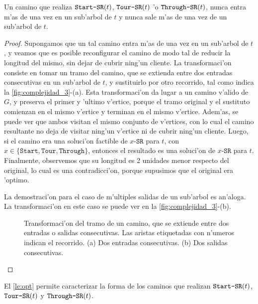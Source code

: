 \begin{lemma}
\label{le:opt}
Un camino que realiza $\texttt{Start-SR}(t)$, $\texttt{Tour-SR}(t)$ 'o $\texttt{Through-SR}(t)$, nunca entra m'as de una vez en un sub'arbol de $t$ y nunca sale m'as de una vez de un sub'arbol de $t$.

\begin{proof}
Supongamos que un tal camino entra m'as de una vez en un sub'arbol de $t$, y veamos que es posible reconfigurar el camino de modo tal de reducir la longitud del mismo, sin dejar de cubrir ning'un cliente. La transformaci'on consiste en tomar un tramo del camino, que se extienda entre dos entradas consecutivas en un sub'arbol de $t$, y sustituirlo por otro recorrido, tal como indica la \autoref{fig:complejidad_3}-(a). Esta transformaci'on da lugar a un camino v'alido de $G$, y preserva el primer y 'ultimo v'ertice, porque el tramo original y el sustituto comienzan en el mismo v'ertice y terminan en el mismo v'ertice. Adem'as, se puede ver que ambos visitan el mismo conjunto de v'ertices, con lo cual el camino resultante no deja de visitar ning'un v'ertice ni de cubrir ning'un cliente. Luego, si el camino era una soluci'on factible de $x\texttt{-SR}$ para $t$, con $x \in \{\texttt{Start}, \texttt{Tour}, \texttt{Through}\}$, entonces el resultado es una soluci'on de $x\texttt{-SR}$ para $t$. Finalmente, observemos que su longitud es 2 unidades menor respecto del original, lo cual es una contradicci'on, porque supusimos que el original era 'optimo.

La demostraci'on para el caso de m'ultiples salidas de un sub'arbol es an'aloga. La transformaci'on en este caso se puede ver en la \autoref{fig:complejidad_3}-(b).

\begin{figure}[h]
	\begin{center}
		
	\end{center}		
	\caption{Transformaci'on del tramo de un camino, que se extiende entre dos entradas o salidas consecutivas. Las aristas etiquetadas con n'umeros indican el recorrido. (a) Dos entradas consecutivas. (b) Dos salidas consecutivas.}
	\label{fig:complejidad_3}
\end{figure}

\end{proof}
\end{lemma}

El \autoref{le:opt} permite caracterizar la forma de los caminos que realizan $\texttt{Start-SR}(t)$, $\texttt{Tour-SR}(t)$ y $\texttt{Through-SR}(t)$.

